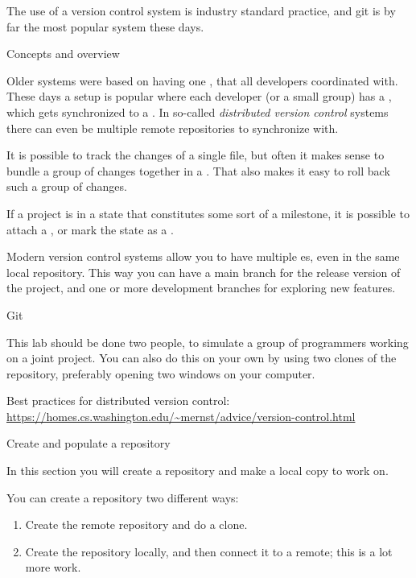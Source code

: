 The use of a version control system is industry standard practice,
and git is by far the most popular system these days.

 {Concepts and overview}

Older systems were based on having one ,
that all developers coordinated with.
These days a setup is popular where each developer (or a small group)
has a ,
which gets synchronized to a .
In so-called \emph{distributed version control}
systems there can even be multiple remote repositories to synchronize with.

It is possible to track the changes of a single file,
but often it makes sense to bundle a group of changes
together in a .
That also makes it easy to roll back such a group of changes.

If a project is in a state that constitutes some sort of a milestone,
it is possible to attach a ,
or mark the state as a .

Modern version control systems allow you to have
multiple es,
even in the same local repository.
This way you can have a main branch for the release version of the project,
and one or more development branches for exploring new features.

 {Git}
\lstset{style=gitsession}

This lab should be done two people, to simulate a group
of programmers working on a joint project. You can also do this on
your own by using two clones of the repository, 
preferably opening two windows on your computer.

Best practices for distributed version control:
\url{https://homes.cs.washington.edu/~mernst/advice/version-control.html}

\newpage
{} {Create and populate a repository}

\begin{purpose}
  In this section you will create a repository and make a local copy
  to work on.
\end{purpose}

You can create a repository two different ways:
\begin{enumerate}
\item Create the remote repository and do a clone.
\item Create the repository locally, and then connect it to a remote;
  this is a lot more work.
\end{enumerate}


